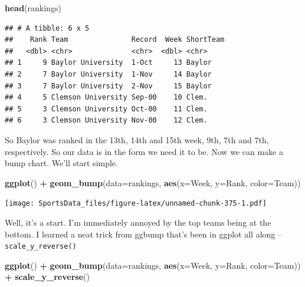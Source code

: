 \documentclass[
]{book}
\newenvironment{Shaded}{\begin{snugshade}}{\end{snugshade}}
\newcommand{\DataTypeTok}[1]{\textcolor[rgb]{0.13,0.29,0.53}{#1}}
\newcommand{\KeywordTok}[1]{\textcolor[rgb]{0.13,0.29,0.53}{\textbf{#1}}}
\newcommand{\NormalTok}[1]{#1}
\newcommand{\OperatorTok}[1]{\textcolor[rgb]{0.81,0.36,0.00}{\textbf{#1}}}
\newcommand{\StringTok}[1]{\textcolor[rgb]{0.31,0.60,0.02}{#1}}
\begin{document}
\begin{Shaded}
\begin{Highlighting}[]
\KeywordTok{head}\NormalTok{(rankings)}
\end{Highlighting}
\end{Shaded}

\begin{verbatim}
## # A tibble: 6 x 5
##    Rank Team               Record  Week ShortTeam
##   <dbl> <chr>              <chr>  <dbl> <chr>    
## 1     9 Baylor University  1-Oct     13 Baylor   
## 2     7 Baylor University  1-Nov     14 Baylor   
## 3     7 Baylor University  2-Nov     15 Baylor   
## 4     5 Clemson University Sep-00    10 Clem.    
## 5     3 Clemson University Oct-00    11 Clem.    
## 6     3 Clemson University Nov-00    12 Clem.
\end{verbatim}

So Baylor was ranked in the 13th, 14th and 15th week, 9th, 7th and 7th, respectively. So our data is in the form we need it to be. Now we can make a bump chart. We'll start simple.

\begin{Shaded}
\begin{Highlighting}[]
\KeywordTok{ggplot}\NormalTok{() }\OperatorTok{+}\StringTok{ }\KeywordTok{geom_bump}\NormalTok{(}\DataTypeTok{data=}\NormalTok{rankings, }\KeywordTok{aes}\NormalTok{(}\DataTypeTok{x=}\NormalTok{Week, }\DataTypeTok{y=}\NormalTok{Rank, }\DataTypeTok{color=}\NormalTok{Team))}
\end{Highlighting}
\end{Shaded}

\texttt{[image: SportsData\_files/figure-latex/unnamed-chunk-375-1.pdf]}

Well, it's a start. I'm immediately annoyed by the top teams being at the bottom. I learned a neat trick from ggbump that's been in ggplot all along -- \texttt{scale\_y\_reverse()}

\begin{Shaded}
\begin{Highlighting}[]
\KeywordTok{ggplot}\NormalTok{() }\OperatorTok{+}\StringTok{ }\KeywordTok{geom_bump}\NormalTok{(}\DataTypeTok{data=}\NormalTok{rankings, }\KeywordTok{aes}\NormalTok{(}\DataTypeTok{x=}\NormalTok{Week, }\DataTypeTok{y=}\NormalTok{Rank, }\DataTypeTok{color=}\NormalTok{Team)) }\OperatorTok{+}\StringTok{ }\KeywordTok{scale_y_reverse}\NormalTok{()}
\end{Highlighting}
\end{Shaded}
\end{document}
